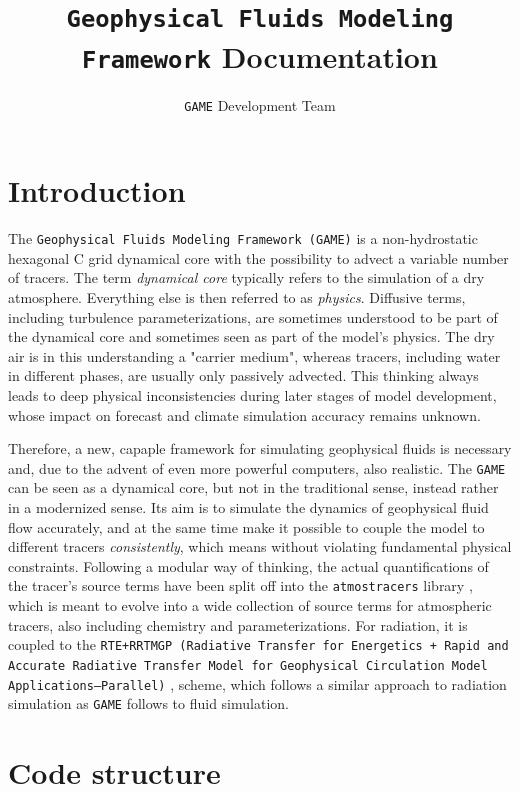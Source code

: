 \documentclass[10pt]{report}
\title{\texttt{Geophysical Fluids Modeling Framework} Documentation}
\author{\texttt{GAME} Development Team}
\date{}
\begin{document}
\maketitle
\tableofcontents

\chapter{Introduction}
\label{chap:introduction}

The \texttt{Geophysical Fluids Modeling Framework (GAME)} is a non-hydrostatic hexagonal C grid dynamical core with the possibility to advect a variable number of tracers. The term \textit{dynamical core} typically refers to the simulation of a dry atmosphere. Everything else is then referred to as \textit{physics}. Diffusive terms, including turbulence parameterizations, are sometimes understood to be part of the dynamical core and sometimes seen as part of the model's physics. The dry air is in this understanding a "carrier medium", whereas tracers, including water in different phases, are usually only passively advected. This thinking always leads to deep physical inconsistencies during later stages of model development, whose impact on forecast and climate simulation accuracy remains unknown.

Therefore, a new, capaple framework for simulating geophysical fluids is necessary and, due to the advent of even more powerful computers, also realistic. The \texttt{GAME} can be seen as a dynamical core, but not in the traditional sense, instead rather in a modernized sense. Its aim is to simulate the dynamics of geophysical fluid flow accurately, and at the same time make it possible to couple the model to different tracers \textit{consistently}, which means without violating fundamental physical constraints. Following a modular way of thinking, the actual quantifications of the tracer's source terms have been split off into the \texttt{atmostracers} library \cite{atmostracers-github}, which is meant to evolve into a wide collection of source terms for atmospheric tracers, also including chemistry and parameterizations. For radiation, it is coupled to the \texttt{RTE+RRTMGP (Radiative Transfer for Energetics + Rapid and Accurate Radiative Transfer Model for Geophysical Circulation Model Applications—Parallel)} \cite{doi:10.1029/2019MS001621}, \cite{rte-rrtmgp-github} scheme, which follows a similar approach to radiation simulation as \texttt{GAME} follows to fluid simulation.

\chapter{Code structure}
\label{chap:code_structure}
\end{document}
